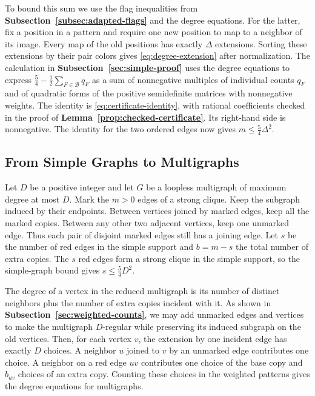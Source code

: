 To bound this sum we use the flag inequalities from
\textbf{Subsection~\ref{subsec:adapted-flags}} and the degree
equations. For the latter, fix a position in a pattern and require
one new position to map to a neighbor of its image. Every map of the
old positions has exactly $\Delta$ extensions. Sorting these
extensions by their pair colors gives \eqref{eq:degree-extension}
after normalization. The calculation in
\textbf{Subsection~\ref{sec:simple-proof}} uses the degree equations to
express $\frac{5}{4}-\frac{1}{2}\sum_{F\in\mathcal B}q_F$ as a sum
of nonnegative multiples of individual counts $q_F$ and of quadratic
forms of the positive semidefinite matrices with nonnegative weights. The identity is \eqref{eq:certificate-identity},
with rational coefficients checked in the proof of
\textbf{Lemma~\ref{prop:checked-certificate}}. Its right-hand side
is nonnegative. The identity for the two ordered edges now gives
$m\leq\frac{5}{4}\Delta^2$.

\subsection{From Simple Graphs to Multigraphs}\label{subsec:weighted-sketch}

Let $D$ be a positive integer and let $G$ be a loopless multigraph of
maximum degree at most $D$. Mark the $m>0$ edges of a strong clique.
Keep the subgraph induced by their endpoints. Between vertices joined
by marked edges, keep all the marked copies. Between any other two
adjacent vertices, keep one unmarked edge. Thus each pair of disjoint
marked edges still has a joining edge. Let $s$ be the number of red
edges in the simple support and $b=m-s$ the total number of extra
copies. The $s$ red edges form a strong clique in the simple support,
so the simple-graph bound gives $s\leq\frac{5}{4}D^2$.

The degree of a vertex in the reduced multigraph is its number of
distinct neighbors plus the number of extra copies incident with it.
As shown in \textbf{Subsection~\ref{sec:weighted-counts}}, we may add
unmarked edges and vertices to make the multigraph $D$-regular while
preserving its induced subgraph on the old vertices. Then, for each
vertex $v$, the extension by one incident edge has exactly $D$
choices. A neighbor $u$ joined to $v$ by an unmarked edge contributes
one choice. A neighbor on a red edge $uv$ contributes one choice of
the base copy and $b_{uv}$ choices of an extra copy. Counting these
choices in the weighted patterns gives the degree equations for
multigraphs.

